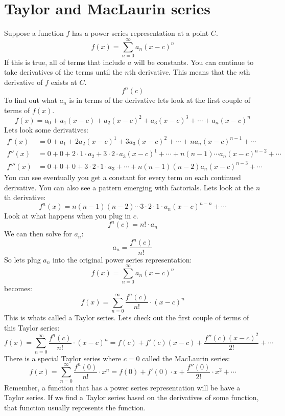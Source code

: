 \documentclass{report}
\begin{document}
\section{Taylor and MacLaurin series}
    Suppose a function \(f\) has a power series representation at a point \(C\).
    \[f(x) = \sum_{n=0}^{\infty} a_n(x-c)^n\]
    If this is true, all of terms that include \(a\) will be constants. 
    You can continue to take derivatives of the terms until the \(n\)th derivative.
    This means that the \(n\)th derivative of \(f\) exists at \(C\).
    \[f^n(c)\]
    To find out what \(a_n\) is in terms of the derivative lets look at the first couple of terms of \(f(x)\).
    \[f(x) = a_0 + a_1(x-c) + a_2(x-c)^2 + a_3(x-c)^3 + \cdots + a_n(x-c)^n\]
    Lets look some derivatives:
    \begin{align*}
        f'(x) &= 0 + a_1 + 2a_2(x-c)^1 + 3a_3(x-c)^2 + \cdots + na_n(x-c)^{n-1} + \cdots \\
        f''(x) &= 0 + 0 + 2 \cdot 1 \cdot a_2 + 3 \cdot 2 \cdot a_3(x-c)^1 + \cdots + n(n-1) \cdots a_n (x-c)^{n-2} + \cdots \\
        f'''(x) &= 0 + 0 + 0 + 3 \cdot 2 \cdot 1 \cdot a_3 + \cdots + n(n-1)(n-2)a_n(x-c)^{n-3} + \cdots
    \end{align*}
    You can see eventually you get a constant for every term on each continued derivative.
    You can also see a pattern emerging with factorials.
    Lets look at the \(n\)th derivative:
    \[f^n(x) = n(n-1)(n-2) \cdots 3 \cdot 2 \cdot 1 \cdot a_n (x-c)^{n-n} + \cdots\]
    Look at what happens when you plug in \(c\).
    \[f^n(c) = n! \cdot a_n  \]
    We can then solve for \(a_n\):
    \[a_n = \frac{f^n(c)}{n!}\]
    So lets plug \(a_n\) into the original power series representation:
    \[f(x) = \sum_{n=0}^{\infty} a_n(x-c)^n\]
    becomes:
    \[f(x) = \sum_{n=0}^{\infty} \frac{f^n(c)}{n!} \cdot (x-c)^n\]
    This is whats called a Taylor series.
    Lets check out the first couple of terms of this Taylor series:
    \[f(x) = \sum_{n=0}^{\infty} \frac{f^n(c)}{n!} \cdot (x-c)^n = f(c) + f'(c)(x-c) + \frac{f''(c)(x-c)^2}{2!} + \cdots\]
    There is a special Taylor series where \(c = 0\) called the MacLaurin series:
    \[f(x) = \sum_{n=0}^{\infty} \frac{f^n(0)}{n!} \cdot x^n = f(0) + f'(0) \cdot x + \frac{f''(0)}{2!}\cdot x^2 + \cdots\]
    Remember, a function that has a power series representation will be have a Taylor series.
    If we find a Taylor series based on the derivatives of some function, that function usually represents the function.
    
\end{document}

